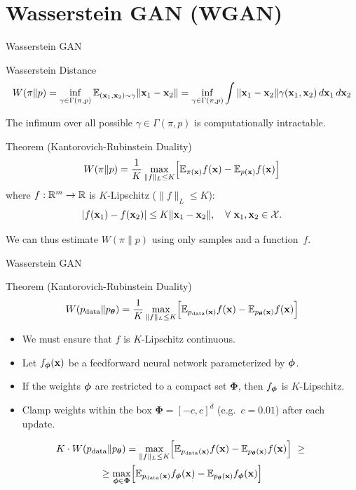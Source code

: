 \documentclass{beamer}
\renewcommand{\eqpause}{}
\begin{document}
\section{Wasserstein GAN (WGAN)}
\begin{frame}{Wasserstein GAN}
	\begin{block}{Wasserstein Distance}
		\vspace{-0.5cm}
		\small
		\[
		W(\pi \| p) = \inf_{\gamma \in \Gamma(\pi, p)} \mathbb{E}_{(\mathbf{x}_1, \mathbf{x}_2) \sim \gamma} \| \mathbf{x}_1 - \mathbf{x}_2 \| =  \inf_{\gamma \in \Gamma(\pi, p)} \int \|\mathbf{x}_1 - \mathbf{x}_2\| \gamma (\mathbf{x}_1, \mathbf{x}_2)\, d\mathbf{x}_1\, d\mathbf{x}_2
		\]
		\vspace{-0.3cm}
	\end{block}
	\eqpause
	The infimum over all possible $\gamma \in \Gamma(\pi, p)$ is computationally intractable.
	\eqpause
	\begin{block}{Theorem (Kantorovich-Rubinstein Duality)}
		\vspace{-0.3cm}
		\[
			W(\pi \| p) = \frac{1}{K} \max_{\| f \|_L \leq K} \Bigl[ \mathbb{E}_{\pi(\mathbf{x})} f(\mathbf{x})  - \mathbb{E}_{p(\mathbf{x})} f(\mathbf{x})\Bigr]
		\]
		where $f : \mathbb{R}^m \rightarrow \mathbb{R}$ is $K$-Lipschitz ($\|f\|_L \leq K$):
		\[
			|f(\mathbf{x}_1) - f(\mathbf{x}_2)| \leq K \|\mathbf{x}_1 - \mathbf{x}_2\|,\quad \forall\ \mathbf{x}_1, \mathbf{x}_2 \in \mathcal{X}.
		\]
		\vspace{-0.6cm}
	\end{block}
	\eqpause
	We can thus estimate $W(\pi \| p)$ using only samples and a function~$f$.
\end{frame}
\begin{frame}{Wasserstein GAN}
	\begin{block}{Theorem (Kantorovich-Rubinstein Duality)}
		\[
		W(p_{\text{data}} \| p_{\boldsymbol{\theta}}) = \frac{1}{K} \max_{\| f \|_L \leq K} \Bigl[ \mathbb{E}_{p_{\text{data}}(\mathbf{x})} f(\mathbf{x})  - \mathbb{E}_{p_{\boldsymbol{\theta}}(\mathbf{x})} f(\mathbf{x})\Bigr]
		\]
	\end{block}
	\begin{itemize}
		\item We must ensure that $f$ is $K$-Lipschitz continuous.
		\item Let $f_{\boldsymbol{\phi}}(\mathbf{x})$ be a feedforward neural network parameterized by $\boldsymbol{\phi}$.
		\item If the weights $\boldsymbol{\phi}$ are restricted to a compact set $\boldsymbol{\Phi}$, then $f_{\boldsymbol{\phi}}$ is $K$-Lipschitz.
		\eqpause
		\item Clamp weights within the box $\boldsymbol{\Phi} = [-c, c]^d$ (e.g.\ $c = 0.01$) after each update.
	\end{itemize}
	\begin{multline*}
		K \cdot W(\pd \| \pt) = \max_{\| f \|_L \leq K} \Bigl[ \bbE_{\pd(\bx)} f(\bx)  - \bbE_{\pt(\bx)} f(\bx)\Bigr]\ \geq\ 
		\\  \geq \max_{\bphi \in \boldsymbol{\Phi}} \Bigl[ \bbE_{\pd(\bx)} f_{\bphi}(\bx)  - \bbE_{\pt(\bx)} f_{\bphi}(\bx)\Bigr]
	\end{multline*}
\end{frame}
\end{document}
